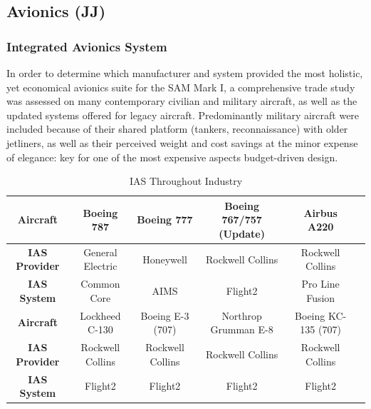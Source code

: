 \subsection{Avionics (JJ)}
\subsubsection{Integrated Avionics System}
In order to determine which manufacturer and system provided the most holistic, yet economical avionics suite for the SAM Mark I, a comprehensive trade study was assessed on many contemporary civilian and military aircraft, as well as the updated systems offered for legacy aircraft.  Predominantly military aircraft were included because of their shared platform (tankers, reconnaissance) with older jetliners, as well as their perceived weight and cost savings at the minor expense of elegance: key for one of the most expensive aspects budget-driven design. 

\begin{table}[!h] 
    \centering
    \caption{IAS Throughout Industry}
    \begin{tabular}{ |c||c|c|c|c|c|}\toprule
    \textbf{Aircraft}  & Boeing 787 & Boeing 777 & Boeing 767/757 (Update) & Airbus A220 \\\hline 
    \textbf{IAS Provider} & General Electric & Honeywell & Rockwell Collins & Rockwell Collins  \\\hline
    \textbf{IAS System} & Common Core & AIMS & Flight2 & Pro Line Fusion \\\hline \hline
    \textbf{Aircraft}  & Lockheed C-130 & Boeing E-3 (707) & Northrop Grumman E-8 & Boeing KC-135 (707) \\\hline
    \textbf{IAS Provider} & Rockwell Collins & Rockwell Collins & Rockwell Collins & Rockwell Collins  \\\hline
    \textbf{IAS System} & Flight2 & Flight2 & Flight2 & Flight2
    \\ \bottomrule
    \end{tabular}\label{tab:ias}
\end{table}

